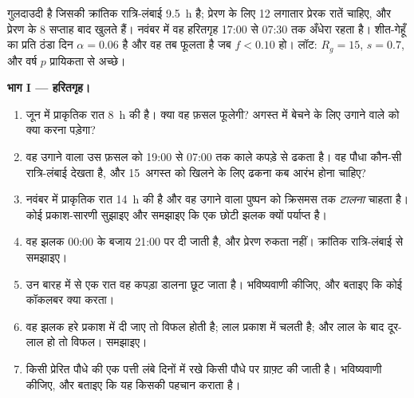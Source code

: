 \begin{problem}
\label{pb:b2:plant-flowering:1}
गुलदाउदी  है जिसकी क्रांतिक रात्रि-लंबाई
\qty{9.5}{h} है; प्रेरण के लिए \num{12} लगातार प्रेरक
रातें चाहिए, और  प्रेरण के \num{8} सप्ताह बाद खुलते हैं। नवंबर में
वह हरितगृह 17:00 से 07:30 तक अँधेरा रहता है। शीत-गेहूँ
का प्रति ठंडा दिन $\alpha = 0.06$ है और वह तब फूलता है जब $f < 0.10$ हो। 
लॉट: $R_g = 15$, $s = 0.7$, और वर्ष $p$ प्रायिकता से अच्छे।

\medskip
\noindent\textbf{भाग I --- हरितगृह।}
\begin{enumerate}
  \item जून में प्राकृतिक रात \qty{8}{h} की है। क्या वह फ़सल
        फूलेगी? अगस्त में  बेचने के लिए उगाने वाले को क्या करना पड़ेगा?
  \item वह उगाने वाला उस फ़सल को 19:00 से 07:00 तक काले कपड़े से
        ढकता है। वह पौधा कौन-सी रात्रि-लंबाई देखता है, और
        15~अगस्त को खिलने के लिए ढकना कब आरंभ होना चाहिए?
  \item नवंबर में प्राकृतिक रात \qty{14}{h} की है और वह उगाने वाला
        पुष्पन को क्रिसमस तक \emph{टालना} चाहता है। कोई प्रकाश-सारणी
        सुझाइए और समझाइए कि एक छोटी झलक क्यों पर्याप्त है।
  \item वह झलक 00:00 के बजाय 21:00 पर दी जाती है,
        और प्रेरण रुकता नहीं। क्रांतिक रात्रि-लंबाई से समझाइए।
  \item उन बारह में से एक रात वह कपड़ा डालना छूट जाता है। भविष्यवाणी
        कीजिए, और बताइए कि कोई कॉकलबर क्या करता।
  \item वह झलक हरे प्रकाश में दी जाए तो विफल होती है; लाल प्रकाश में
        चलती है; और लाल के बाद दूर-लाल हो तो विफल। समझाइए।
  \item किसी प्रेरित पौधे की एक पत्ती लंबे दिनों में रखे किसी पौधे पर
        ग्राफ़्ट की जाती है। भविष्यवाणी कीजिए, और बताइए कि यह किसकी पहचान कराता है।
\end{enumerate}


\end{problem}
